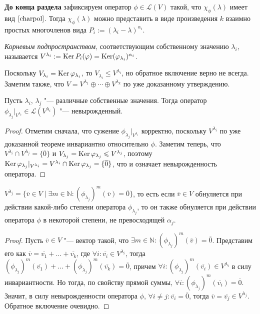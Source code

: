 \textbf{До конца раздела} зафиксируем оператор $\phi \in \mathcal L(V)$ такой, что  $\chi_\phi(\lambda)$ имеет вид $\eqref*{charpol}$. Тогда $\chi_\phi(\lambda)$ можно представить в виде произведения $k$ взаимно простых многочленов вида $P_i := (\lambda_i - \lambda)^{\alpha_i}$.

\begin{definition}
	\textit{Корневым подпространством}, соответствующим собственному значению $\lambda_i$, называется $V^{\lambda_i} := \ke{P_i(\phi)} \hm{=} \ke(\phi_{\lambda_i})^{\alpha_i}$.
\end{definition}

\begin{note}
	Поскольку $V_{\lambda_i} = \operatorname{Ker}{\varphi_{\lambda_i}}$, то $V_{\lambda_i} \le V^{\lambda_i}$, но обратное включение верно не всегда. Заметим также, что $V = V^{\lambda_1} \oplus \dotsb \oplus V^{\lambda_k}$ по уже доказанному утверждению.
\end{note}

\begin{proposition}
	Пусть $\lambda_i$, $\lambda_j$ "--- различные собственные значения. Тогда оператор $\phi_{\lambda_j}|_{V^{\lambda_i}} \in \mathcal{L}(V^{\lambda_i})$ "--- невырожденный.
\end{proposition}

\begin{proof}
	Отметим сначала, что сужение $\phi_{\lambda_j}|_{V^{\lambda_i}}$ корректно, поскольку $V^{\lambda_i}$ по уже доказанной теореме инвариантно относительно $\phi$. Заметим теперь, что $V^{\lambda_i} \cap V^{\lambda_j} = \{\overline{0}\}$ и $V_{\lambda_j} = \operatorname{Ker}{\varphi_{\lambda_j}} \leqslant V^{\lambda_j}$, поэтому $\ke{\phi_{\lambda_j}|_{V^{\lambda_i}}} = V^{\lambda_i} \cap \ke{\phi_{\lambda_j}} \hm{=} \{\overline{0}\}$, что и означает невырожденность оператора.
\end{proof}

\begin{proposition}
	$V^{\lambda_j} = \{\overline{v} \in V\mid \exists m \in \mathbb{N}: (\phi_{\lambda_j})^m(\overline{v}) = \overline{0}\}$, то есть если $\overline{v} \in V$ обнуляется при действии какой-либо степени оператора $\phi_{\lambda_j}$, то он также обнуляется при действии оператора $\phi$ в некоторой степени, не превосходящей $\alpha_j$.
\end{proposition}

\begin{proof}
	Пусть $\overline{v} \in V$ "--- вектор такой, что $\exists m \in \mathbb{N}: (\phi_{\lambda_j})^m(\overline{v}) = \overline{0}$. Представим его как $\overline{v} = \overline{v_1} + \dots + \overline{v_k}$, где $ \forall i: \overline{v_i} \in V^{\lambda_i}$, тогда $(\phi_{\lambda_j})^m(\overline{v_1}) + \dots +  (\phi_{\lambda_j})^m(\overline{v_k}) = \overline{0}$, причем $ \forall i: (\phi_{\lambda_j})^m(\overline{v_i}) \in V^{\lambda_i}$ в силу инвариантности. Но тогда, по свойству прямой суммы, $\forall i: (\phi_{\lambda_j})^m(\overline{v_i}) = \overline{0}$. Значит, в силу невырожденности оператора $\phi$, $\forall i \ne j: \overline{v_i} = \overline{0}$, тогда $\overline{v} = \overline{v_j} \in V^{\lambda_j}$. Обратное включение очевидно.
\end{proof}

